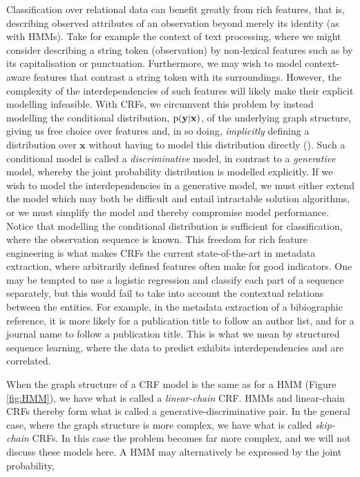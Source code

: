Classification over relational data can benefit greatly from rich features, that is, describing observed attributes of an observation beyond merely its identity (as with HMMs). Take for example the context of text processing, where we might consider describing a string token (observation) by non-lexical features such as by its capitalisation or punctuation. Furthermore, we may wish to model context-aware features that contrast a string token with its surroundings. However, the complexity of the interdependencies of such features will likely make their explicit modelling infeasible. With CRFs, we circumvent this problem by instead modelling the conditional distribution, $\text{p}(\mathbf{y}|\mathbf{x})$, of the underlying graph structure, giving us free choice over features and, in so doing, \emph{implicitly} defining a distribution over $\mathbf{x}$ without having to model this distribution directly (\cite{sutton2006introduction}). Such a conditional model is called a \emph{discriminative} model, in contrast to a \emph{generative} model, whereby the joint probability distribution is modelled explicitly. If we wish to model the interdependencies in a generative model, we must either extend the model which may both be difficult and entail intractable solution algorithms, or we must simplify the model and thereby compromise model performance. Notice that modelling the conditional distribution is sufficient for classification, where the observation sequence is known. This freedom for rich feature engineering is what makes CRFs the current state-of-the-art in metadata extraction, where arbitrarily defined features often make for good indicators. One may be tempted to use a logistic regression and classify each part of a sequence separately, but this would fail to take into account the contextual relations between the entities. For example, in the metadata extraction of a bibiographic reference, it is more likely for a publication title to follow an author list, and for a journal name to follow a publication title. This is what we mean by structured sequence learning, where the data to predict exhibits interdependencies and are correlated.

When the graph structure of a CRF model is the same as for a HMM (Figure \ref{fig:HMM}), we have what is called a \emph{linear-chain} CRF. HMMs and linear-chain CRFs thereby form what is called a generative-discriminative pair. In the general case, where the graph structure is more complex, we have what is called \emph{skip-chain} CRFs. In this case the problem becomes far more complex, and we will not discuss these models here. A HMM may alternatively be expressed by the joint probability,

